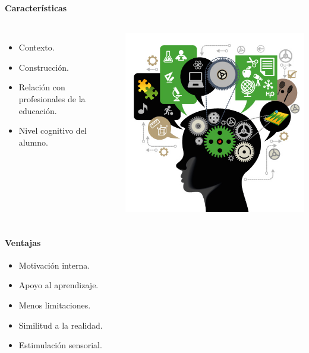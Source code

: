 \begin{frame}
    \frametitle{\pagetitle}
    \framesubtitle{Características}
    \begin{columns}
     \hspace{0.5cm}
     \begin{itemize}[<+->]
         \item Contexto.
         \item Construcción.
         \item Relación con profesionales de la educación.
         \item Nivel cognitivo del alumno.
    \end{itemize}
     \hspace{0.5cm}
    \includegraphics[scale=0.25]{imagenes/aprendizaje}
    \end{columns}
\end{frame}

\begin{frame}
\frametitle{\pagetitle}
\framesubtitle{Ventajas}

\begin{itemize}[<+->]
    \item Motivación interna.
    \item Apoyo al aprendizaje.
    \item Menos limitaciones.
    \item Similitud a la realidad.
    \item Estimulación sensorial.
\end{itemize}


\end{frame}

